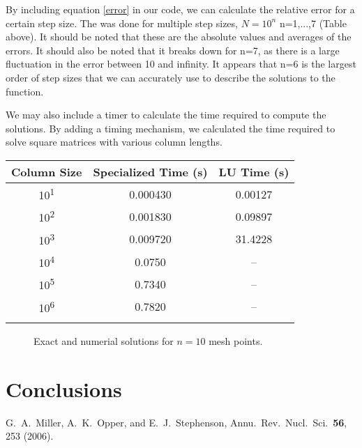 \documentclass[10pt,showpacs,preprintnumbers,footinbib,amsmath,amssymb,aps,prl,twocolumn,groupedaddress,superscriptaddress,showkeys]{revtex4-1}
\begin{document}
	By including equation \ref{error} in our code, we can calculate the relative error for a certain step size.  The was done for multiple step sizes, $N=10^{n}$ n=1,...,7 (Table above).    It should be noted that these are the absolute values and averages of the errors.  It should also be noted that it breaks down for n=7, as there is a large fluctuation in the error between 10 and infinity.  It appears that n=6 is the largest order of step sizes that we can accurately use to describe the solutions to the function.
	
	We may also include a timer to calculate the time required to compute the solutions.  By adding a timing mechanism, we calculated the time required to solve square matrices with various column lengths.
	
	\begin{center}
		\begin{tabular}{ccc}
			\hline \hline
			Column Size & Specialized Time (s) & LU Time (s)\\
			\hline
			10\textsuperscript{1} & 0.000430 & 0.00127\\
			10\textsuperscript{2} & 0.001830 &  0.09897\\
			10\textsuperscript{3} & 0.009720 & 31.4228\\
			10\textsuperscript{4} & 0.0750       &  --\\
			10\textsuperscript{5} & 0.7340  & --\\
			10\textsuperscript{6} & 0.7820  & --\\
			\hline
			\label{timingtable}
		\end{tabular}
	\end{center}
	
	
\begin{figure}[hbtp]

\caption{Exact and numerial solutions for $n=10$ mesh points.} 
\label{fig:n10points}
\end{figure}

\section{Conclusions}

\begin{thebibliography}{99}
 G.~A.~Miller, A.~K.~Opper, and E.~J.~Stephenson, Annu.~Rev.~Nucl.~Sci.~{\bf 56}, 253 (2006).
\end{thebibliography}
\end{document}
